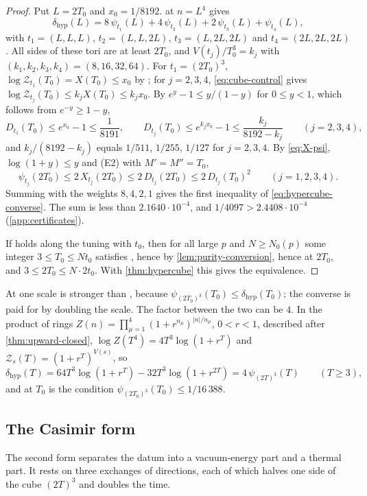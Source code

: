 \documentclass[11pt,a4paper]{amsart}
\theoremstyle{definition}
\theoremstyle{remark}
\numberwithin{equation}{section}
\newcommand{\TT}{\mathbb{T}}               %
\newcommand{\Zc}{\mathcal{Z}}              %
\newcommand{\Zs}[2]{\Zc_{#1}(#2)}          %
\newcommand{\XT}[2]{X_{#1}(#2)}            %
\newcommand{\Dexc}[2]{D_{#1}(#2)}          %
\newcommand{\psiT}[2]{\psi_{#1}(#2)}       %
\newcommand{\Vol}[1]{V(#1)}                %
\newcommand{\cube}[1]{(2#1)^3}             %
\newcommand{\dconst}{\frac{1}{4097}}       %
\newcommand{\xconst}{\frac{1}{8192}}       %
\newcommand{\dconstinl}{1/4097}            %
\newcommand{\xconstinl}{1/8192}            %
\newcommand{\Mcirc}{\text{\upshape(M$^{\circ}$)}}   %
\newcommand{\Bcirc}{\text{\upshape(B$^{\circ}$)}}   %
\newcommand{\Hcirc}{\text{\upshape(H$^{\circ}$)}}   %
\newcommand{\tzero}{t_0}                   %
\begin{document}
\begin{proof}
Put $L=2T_0$ and $x_0=\xconstinl$.  at $n=L^4$ gives
\[
\delta_{\mathrm{hyp}}(L)=8\,\psiT{t_1}{L}+4\,\psiT{t_2}{L}+2\,\psiT{t_3}{L}+\psiT{t_4}{L},
\]
with $t_1=(L,L,L)$, $t_2=(L,L,2L)$, $t_3=(L,2L,2L)$ and $t_4=(2L,2L,2L)$. All sides of these tori are at least $2T_0$, and $\Vol{t_j}/T_0^3=k_j$ with $(k_1,k_2,k_3,k_4)=(8,16,32,64)$. For $t_1=\cube{T_0}$, $\log\Zs{t_1}{T_0}=X(T_0)\le x_0$ by \Bcirc{}; for $j=2,3,4$, \eqref{eq:cube-control} gives $\log\Zs{t_j}{T_0}\le k_jX(T_0)\le k_jx_0$. By $e^y-1\le y/(1-y)$ for $0\le y<1$, which follows from $e^{-y}\ge1-y$,
\[
\Dexc{t_1}{T_0}\le e^{x_0}-1\le\frac1{8191},\qquad \Dexc{t_j}{T_0}\le e^{k_jx_0}-1\le\frac{k_j}{8192-k_j}\qquad(j=2,3,4),
\]
and $k_j/(8192-k_j)$ equals $1/511$, $1/255$, $1/127$ for $j=2,3,4$. By \eqref{eq:X-psi}, $\log(1+y)\le y$ and (E2) with $M'=M''=T_0$,
\[
\psiT{t_j}{2T_0}\le2\,\XT{t_j}{2T_0}\le2\,\Dexc{t_j}{2T_0}\le2\,\Dexc{t_j}{T_0}^2\qquad(j=1,2,3,4).
\]
Summing with the weights $8,4,2,1$ gives the first inequality of \eqref{eq:hypercube-converse}. The sum is less than $2.1640\cdot10^{-4}$, and $\dconstinl>2.4408\cdot10^{-4}$ (\cref{app:certificates}).

If \Mcirc{} holds along the tuning with $\tzero$, then for all large $p$ and $N\ge N_0(p)$ some integer $3\le T_0\le N\tzero$ satisfies \Mcirc, hence \Bcirc{} by \cref{lem:purity-conversion}, hence \Hcirc{} at $2T_0$, and $3\le2T_0\le N\cdot2\tzero$. With \cref{thm:hypercube} this gives the equivalence.
\end{proof}

At one scale \Hcirc{} is stronger than \Mcirc, because $\psiT{\cube{T_0}}{T_0}\le\delta_{\mathrm{hyp}}(T_0)$; the converse is paid for by doubling the scale. The factor between the two can be $4$. In the product of rings $Z(n)=\prod_{\mu=1}^4(1+r^{n_\mu})^{|n|/n_\mu}$, $0<r<1$, described after \cref{thm:upward-closed}, $\log Z(T^4)=4T^3\log(1+r^T)$ and $\Zs{s}{T}=(1+r^T)^{\Vol{s}}$, so
\[
\delta_{\mathrm{hyp}}(T)=64T^3\log(1+r^T)-32T^3\log(1+r^{2T})=4\,\psiT{\cube{T}}{T}\qquad(T\ge3),
\]
and \Hcirc{} at $T_0$ is the condition $\psiT{\cube{T_0}}{T_0}\le1/16\,388$.

\subsection{The Casimir form}

The second form separates the datum into a vacuum-energy part and a thermal part. It rests on three exchanges of directions, each of which halves one side of the cube $\cube{T}$ and doubles the time.
\end{document}
